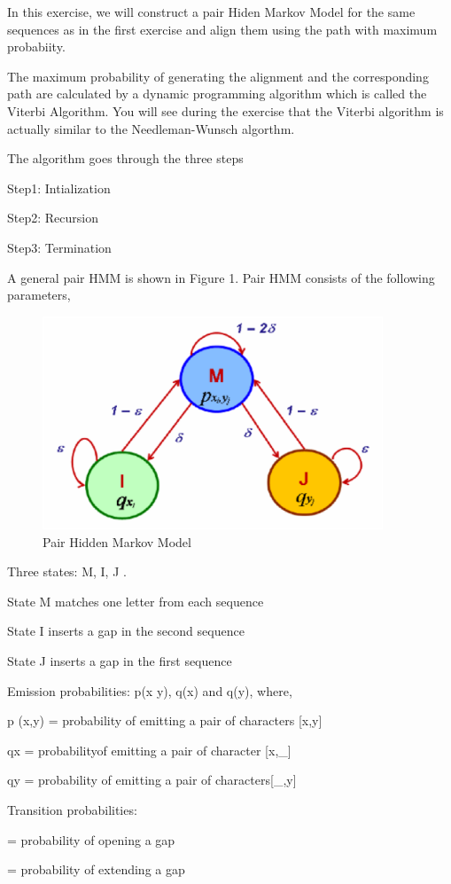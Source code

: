 \documentclass[a4paper,11pt]{article}
\DeclareRobustCommand{\greektext}{%
  \fontencoding{LGR}\selectfont\def\encodingdefault{LGR}}
\DeclareRobustCommand{\textgreek}[1]{\leavevmode{\greektext #1}}
\begin{document}
In this exercise, we will construct a pair Hiden Markov Model for
the same sequences as in the first exercise and align them using the
path with maximum probabiity.

The maximum probability of generating the alignment and the corresponding path are calculated by a dynamic
programming algorithm which is called the Viterbi Algorithm. You will
see during the exercise that the Viterbi algorithm is actually similar
to the Needleman-Wunsch algorthm.
\vspace{0.5cm}


The algorithm goes through the three steps

Step1: Intialization

Step2: Recursion

Step3: Termination

\vspace{0.5cm}

A general pair HMM is shown in Figure 1. Pair HMM consists of the following parameters,
\begin{figure}
\begin{centering}
\includegraphics[width=4in]{HMMfigures}\caption{Pair Hidden Markov Model}
\par\end{centering}
\end{figure}

\vspace{0.5cm}

Three states: M, I, J .

State M matches one letter from each sequence

State I inserts a gap in the second sequence 

State J inserts a gap in the first sequence

\vspace{0.5cm}

Emission probabilities: p(x y), q(x) and q(y), where,

p (x,y) = probability of emitting a pair of characters {[}x,y{]} 

qx = probabilityof emitting a pair of character {[}x,\_{]}

qy = probability of emitting a pair of characters{[}\_,y{]}

\vspace{0.5cm}

Transition probabilities:

\textgreek{d} = probability of opening a gap 

\textgreek{e} = probability of extending a gap 
\end{document}
